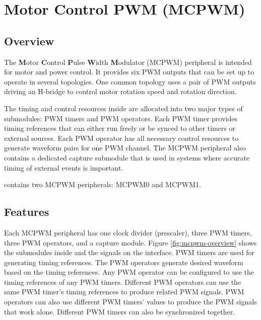 \documentclass[main\_\_EN.tex]{subfiles}
\begin{document}

\ifglobal
\else
    {\let\clearpage\relax \listoftodos}
    \tableofcontents
\fi


\hypertarget{mcpwm}{}
\chapter{Motor Control PWM (MCPWM)}
\label{mod:mcpwm}


\section{Overview}

The \textbf{M}otor \textbf{C}ontrol \textbf{P}ulse \textbf{W}idth \textbf{M}odulator (MCPWM) peripheral is intended for motor and power control. It provides six PWM outputs that can be set up to operate in several topologies. One common topology uses a pair of PWM outputs driving an H-bridge to control motor rotation speed and rotation direction.

The timing and control resources inside are allocated into two major types of submodules: PWM timers and PWM operators. Each PWM timer provides timing references that can either run freely or be synced to other timers or external sources. Each PWM operator has all necessary control resources to generate waveform pairs for one PWM channel. The MCPWM peripheral also contains a dedicated capture submodule that is used in systems where accurate timing of external events is important.

\chipname{} contains two MCPWM peripherals: MCPWM0 and MCPWM1.

\section{Features}
Each MCPWM peripheral has one clock divider (prescaler), three PWM timers, three PWM operators, and a capture module. Figure \ref{fig:mcpwm-overview} shows the submodules inside and the signals on the interface. PWM timers are used for generating timing references. The PWM operators generate desired waveform based on the timing references. Any PWM operator can be configured to use the timing references of any PWM timers. Different PWM operators can use the same PWM timer's timing references to produce related PWM signals. PWM operators can also use different PWM timers' values to produce the PWM signals that work alone. Different PWM timers can also be synchronized together.
\end{document}
